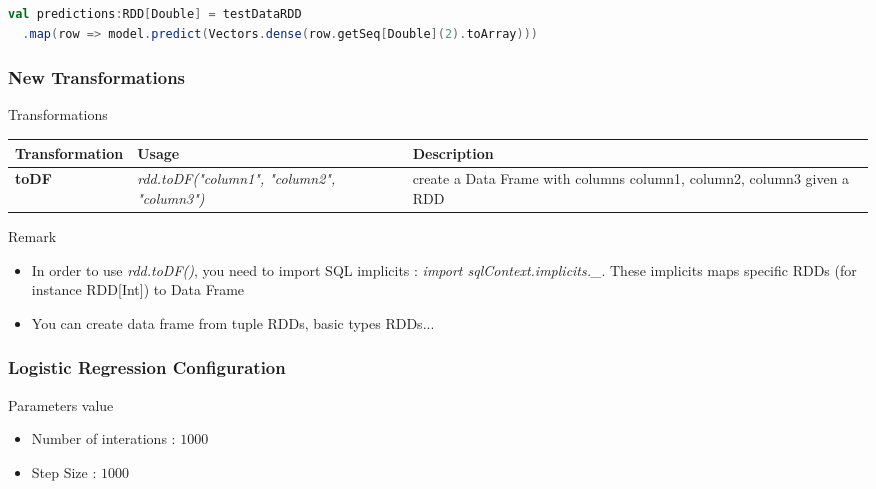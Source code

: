 \documentclass[slidetop,9pt,utf8]{beamer}
\begin{document}
\begin{CJK}{UTF8}{gbsn}
\begin{frame}[fragile]
  \begin{lstlisting}[label=TransformDataToLinearRegression, caption=Transform row into LabeledPoint, language=scala, style=code]
val predictions:RDD[Double] = testDataRDD
  .map(row => model.predict(Vectors.dense(row.getSeq[Double](2).toArray)))
  \end{lstlisting}

\end{frame}

\begin{frame}

  \frametitle{New Transformations}

  \begin{block}{Transformations}
    \begin{center}
      \begin{tabular}{|m{2.1cm}|m{3.5cm}|m{5cm}|}
        \hline 
        \rowcolor{gray} \textbf{Transformation} & \textbf{Usage} & \textbf{Description} \\ \hline
        \textbf{toDF} & \textit{rdd.toDF("column1", "column2", "column3")} & create a Data Frame with columns column1, column2, column3 given a RDD \\ \hline
      \end{tabular}
    \end{center}
  \end{block}

  \begin{block}{Remark}
    \begin{itemize}
      \item In order to use \textit{rdd.toDF()}, you need to import SQL implicits : \textit{import sqlContext.implicits.\_}. These implicits maps specific RDDs (for instance RDD[Int]) to Data Frame
      \item You can create data frame from tuple RDDs, basic types RDDs...
    \end{itemize}
  \end{block}

\end{frame}

\begin{frame}
  \frametitle{Logistic Regression Configuration}

  \begin{block}{Parameters value}
    \begin{itemize}
      \item Number of interations : $1000$
      \item Step Size : $1000$
    \end{itemize}
  \end{block}


\end{frame}
\end{CJK}
\end{document}
